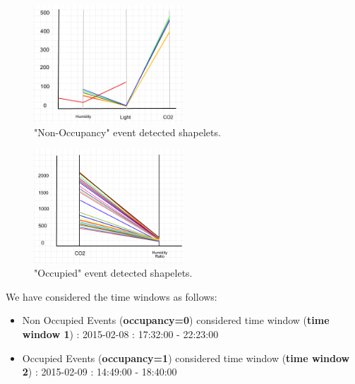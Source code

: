 \documentclass[conference]{IEEEtran}  %
\begin{document}
\begin{figure}
\includegraphics[width=0.5\textwidth]{Occupancy_event1.png}
\caption{"Non-Occupancy" event detected shapelets.}
\label{fig:occupancyEvent1}
\squeezeup\squeezeup
\end{figure}

\begin{figure}
\includegraphics[width=0.5\textwidth]{Occupancy_event2.png}
\caption{"Occupied" event detected shapelets.}
\label{fig:occupancyEvent2}
\squeezeup\squeezeup
\end{figure}


We have considered the time windows as follows:
\begin{itemize}
\item Non Occupied Events (\textbf{occupancy=0}) considered time window (\textbf{time window 1}) : 2015-02-08 : 17:32:00 - 22:23:00
\item Occupied Events (\textbf{occupancy=1}) considered time window (\textbf{time window 2}) : 2015-02-09 : 14:49:00 - 18:40:00
\end{itemize}
\end{document}
